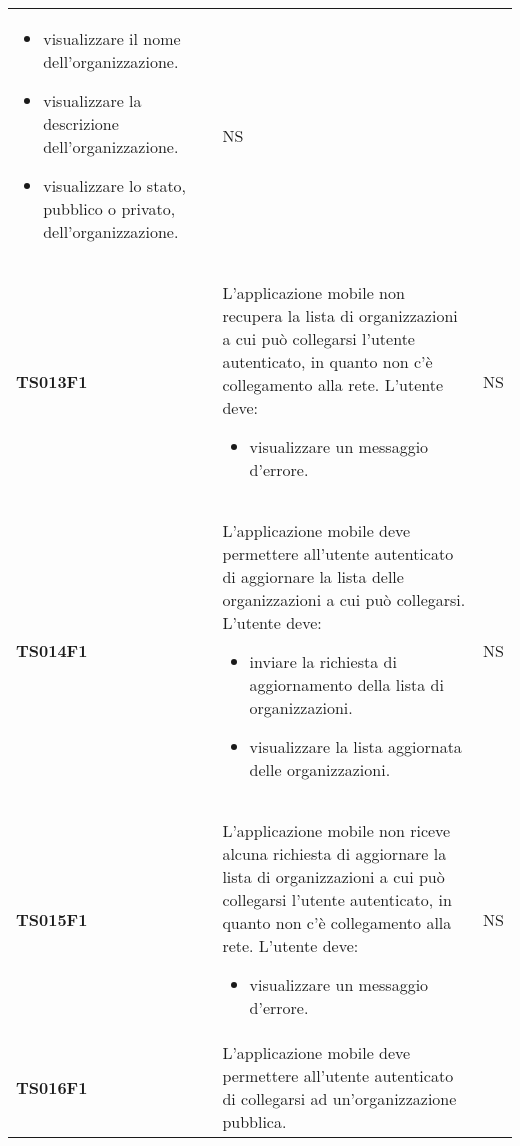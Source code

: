 \documentclass[../piano-di-qualifica.tex]{subfiles}
\begin{document}
\begin{centering}
\begin{longtable}[H]{>{\centering\bfseries}m{3cm} >{}p{10cm} >{\centering\arraybackslash}m{3cm}}
\begin{itemize}
                        \item visualizzare il nome dell'organizzazione.
                        \item visualizzare la descrizione dell'organizzazione.
                        \item visualizzare lo stato, pubblico o privato, dell'organizzazione.
                      \end{itemize}
                    & NS \\
        TS013F1     & L'applicazione mobile non recupera la lista di organizzazioni a cui può collegarsi l'utente autenticato, in quanto non c'è collegamento alla rete. \newline
                      L'utente deve:
                      \begin{itemize}
                        \item visualizzare un messaggio d'errore.
                      \end{itemize}
                    & NS \\
        TS014F1     & L'applicazione mobile deve permettere all'utente autenticato di aggiornare la lista delle organizzazioni a cui può collegarsi. \newline
                      L'utente deve:
                      \begin{itemize}
                        \item inviare la richiesta di aggiornamento della lista di organizzazioni.
                        \item visualizzare la lista aggiornata delle organizzazioni.
                      \end{itemize}
                    & NS \\
        TS015F1     & L'applicazione mobile non riceve alcuna richiesta di aggiornare la lista di organizzazioni a cui può collegarsi l'utente autenticato, in quanto non c'è collegamento alla rete. \newline
                      L'utente deve:
                      \begin{itemize}
                        \item visualizzare un messaggio d'errore.
                      \end{itemize}
                    & NS \\
        TS016F1     & L'applicazione mobile deve permettere all'utente autenticato di collegarsi ad un'organizzazione pubblica. \newline

\end{longtable}
\end{centering}
\end{document}
